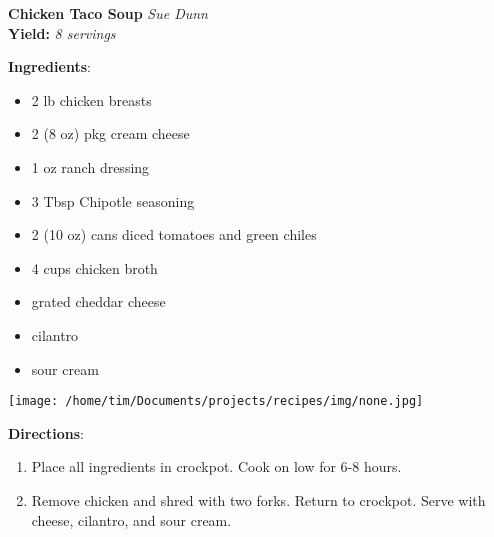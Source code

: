 \documentclass[11pt, twoside, openany]{book}
\begin{document}
\noindent\begin{minipage}[t]{\linewidth}%
{\Large\textbf{Chicken Taco Soup}} \label{chicken-taco-soup}\hfill\textit{Sue Dunn}\\
\textbf{Yield:} \textit{8 servings}\\
\noindent\begin{minipage}[t]{0.78\linewidth}%
\textbf{Ingredients}:\vspace{-3mm}
\begin{multicols}{2}
\begin{itemize}\setlength\itemsep{-1mm}
\item 2 lb chicken breasts
\item 2 (8 oz) pkg cream cheese
\item 1 oz ranch dressing
\item 3 Tbsp Chipotle seasoning
\item 2 (10 oz) cans diced tomatoes and green chiles
\item 4 cups chicken broth
\item grated cheddar cheese
\item cilantro
\item sour cream
\end{itemize}
\end{multicols}
\end{minipage}
\noindent\begin{minipage}[t]{0.18\linewidth}
\centering \strut\vspace*{-\baselineskip}\newline
\texttt{[image: /home/tim/Documents/projects/recipes/img/none.jpg]}\\
\end{minipage}\vspace{3mm}
\textbf{Directions}:
\vspace{-3mm}\begin{enumerate}\setlength\itemsep{-1mm}
\item Place all ingredients in crockpot. Cook on low for 6-8 hours.
\item Remove chicken and shred with two forks. Return to crockpot. Serve with cheese, cilantro, and sour cream.
\end{enumerate}
\end{minipage}\vspace{8mm}
\end{document}
